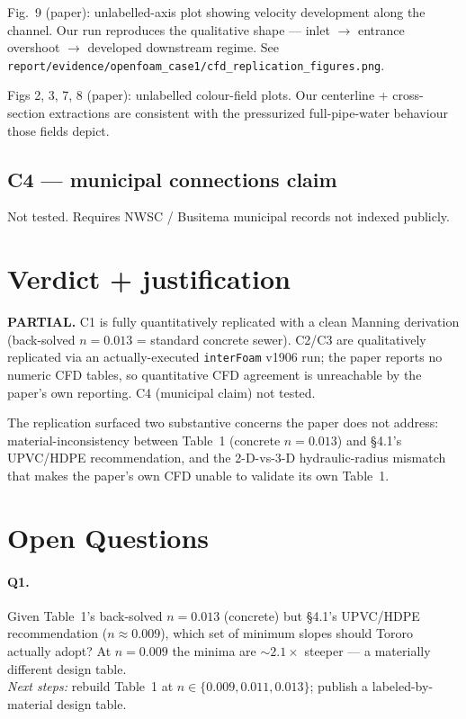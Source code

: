 \documentclass[11pt,a4paper]{article}
\begin{document}
Fig.~9 (paper): unlabelled-axis plot showing velocity development along the channel. Our
run reproduces the qualitative shape --- inlet $\to$ entrance overshoot $\to$ developed
downstream regime. See \texttt{report/evidence/openfoam\_case1/cfd\_replication\_figures.png}.

Figs 2, 3, 7, 8 (paper): unlabelled colour-field plots. Our centerline + cross-section
extractions are consistent with the pressurized full-pipe-water behaviour those fields
depict.

\subsection{C4 --- municipal connections claim}
Not tested. Requires NWSC / Busitema municipal records not indexed publicly.

\section{Verdict + justification}

\textbf{PARTIAL.} C1 is fully quantitatively replicated with a clean Manning derivation
(back-solved $n=0.013$ = standard concrete sewer). C2/C3 are qualitatively replicated via
an actually-executed \texttt{interFoam} v1906 run; the paper reports no numeric CFD
tables, so quantitative CFD agreement is unreachable by the paper's own reporting.
C4 (municipal claim) not tested.

The replication surfaced two substantive concerns the paper does not address:
material-inconsistency between Table~1 (concrete $n=0.013$) and \S4.1's UPVC/HDPE
recommendation, and the 2-D-vs-3-D hydraulic-radius mismatch that makes the paper's own
CFD unable to validate its own Table~1.

\section{Open Questions}

\paragraph{Q1.} Given Table~1's back-solved $n = 0.013$ (concrete) but \S4.1's UPVC/HDPE recommendation ($n\approx 0.009$), which set of minimum slopes should Tororo actually adopt? At $n=0.009$ the minima are $\sim 2.1\times$ steeper --- a materially different design table.\\
\textit{Next steps:} rebuild Table~1 at $n\in\{0.009, 0.011, 0.013\}$; publish a labeled-by-material design table.
\end{document}
